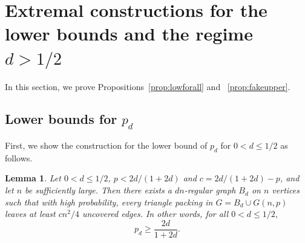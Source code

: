 \documentclass[11pt,reqno]{amsart}
\newtheorem{lemma}[theorem]{Lemma}
\theoremstyle{definition}
\theoremstyle{remark}
\renewcommand\leq{\leqslant}
\renewcommand\geq{\geqslant}
\begin{document}
\medskip





\section{Extremal constructions for the lower bounds and the regime $d>1/2$}\label{sec:low}

In this section, we prove Propositions~\ref{prop:lowforall} and ~\ref{prop:fakeupper}.


\subsection{Lower bounds for $p_d$}
First, we show the construction for the lower bound of $p_d$ for $0<d\leq1/2$ as follows.

\begin{lemma}\label{lem:low0<d<1/2}
Let $0<d\leq 1/2$, $p< 2d/(1+2d)$ and $c=2d/(1+2d)-p$, and let $n$ be sufficiently large. Then there exists a $dn$-regular graph $B_d$ on $n$ vertices such that with high probability, every triangle packing in $G=B_d\cup G(n,p)$ leaves at least $cn^2/4$ uncovered edges. In other words, for all $0<d\leq 1/2$,
$$p_d\geq \frac{2d}{1+2d}.$$
\end{lemma}
\end{document}
